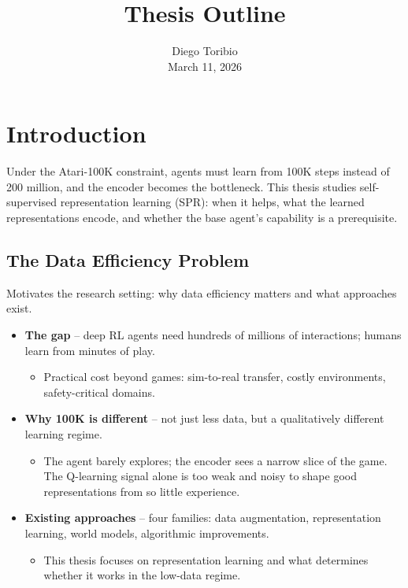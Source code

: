 \documentclass[11pt]{article}
\title{Thesis Outline}
\author{Diego Toribio\\[0.3em]{\normalsize March 11, 2026}}
\date{\vspace{-2.5em}}
\begin{document}
\maketitle
\thispagestyle{empty}
\leftlinenumbers
\linenumbers

\section{Introduction}

\noindent Under the Atari-100K constraint, agents must learn from 100K
steps instead of 200 million, and the encoder becomes the bottleneck.
This thesis studies self-supervised representation learning (SPR): when
it helps, what the learned representations encode, and whether the base
agent's capability is a prerequisite.

\subsection{The Data Efficiency Problem}

\noindent Motivates the research setting: why data efficiency matters
and what approaches exist.

\begin{itemize}
\item \textbf{The gap} -- deep RL agents need hundreds of millions of
  interactions; humans learn from minutes of play.
  \begin{itemize}[label=$\circ$, itemsep=0.2em, parsep=0pt, topsep=0pt, partopsep=0pt]
  \item Practical cost beyond games: sim-to-real transfer, costly
    environments, safety-critical domains.
  \end{itemize}
\item \textbf{Why 100K is different} -- not just less data, but a
  qualitatively different learning regime.
  \begin{itemize}[label=$\circ$, itemsep=0.2em, parsep=0pt, topsep=0pt, partopsep=0pt]
  \item The agent barely explores; the encoder sees a narrow slice
    of the game. The Q-learning signal alone is too weak and noisy
    to shape good representations from so little experience.
  \end{itemize}
\item \textbf{Existing approaches} -- four families: data augmentation,
  representation learning, world models, algorithmic improvements.
  \begin{itemize}[label=$\circ$, itemsep=0.2em, parsep=0pt, topsep=0pt, partopsep=0pt]
  \item This thesis focuses on representation learning and what
    determines whether it works in the low-data regime.
  \end{itemize}
\end{itemize}
\end{document}
